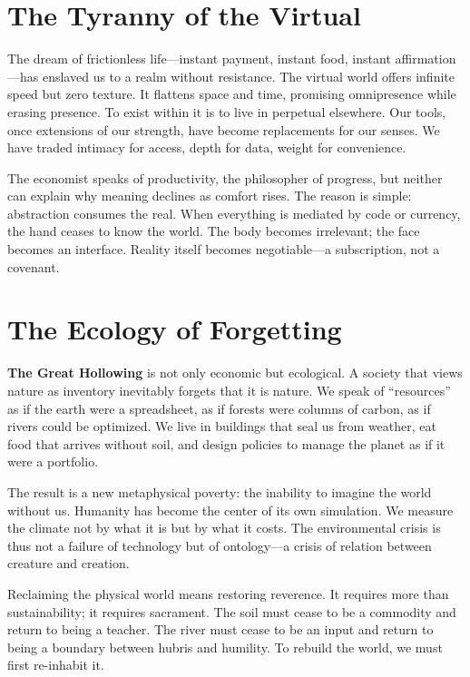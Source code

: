 \documentclass[11pt,twoside]{book}
\begin{document}
\section*{The Tyranny of the Virtual}

The dream of frictionless life—instant payment, instant food, instant affirmation—has enslaved us to a realm without resistance.  
The virtual world offers infinite speed but zero texture.  
It flattens space and time, promising omnipresence while erasing presence.  
To exist within it is to live in perpetual elsewhere.  
Our tools, once extensions of our strength, have become replacements for our senses.  
We have traded intimacy for access, depth for data, weight for convenience.

The economist speaks of productivity, the philosopher of progress, but neither can explain why meaning declines as comfort rises.  
The reason is simple: abstraction consumes the real.  
When everything is mediated by code or currency, the hand ceases to know the world.  
The body becomes irrelevant; the face becomes an interface.  
Reality itself becomes negotiable—a subscription, not a covenant.

\section*{The Ecology of Forgetting}

\textbf{The Great Hollowing} is not only economic but ecological.  
A society that views nature as inventory inevitably forgets that it is nature.  
We speak of “resources” as if the earth were a spreadsheet, as if forests were columns of carbon, as if rivers could be optimized.  
We live in buildings that seal us from weather, eat food that arrives without soil, and design policies to manage the planet as if it were a portfolio.

The result is a new metaphysical poverty: the inability to imagine the world without us.  
Humanity has become the center of its own simulation.  
We measure the climate not by what it is but by what it costs.  
The environmental crisis is thus not a failure of technology but of ontology—a crisis of relation between creature and creation.

Reclaiming the physical world means restoring reverence.  
It requires more than sustainability; it requires sacrament.  
The soil must cease to be a commodity and return to being a teacher.  
The river must cease to be an input and return to being a boundary between hubris and humility.  
To rebuild the world, we must first re-inhabit it.
\end{document}
